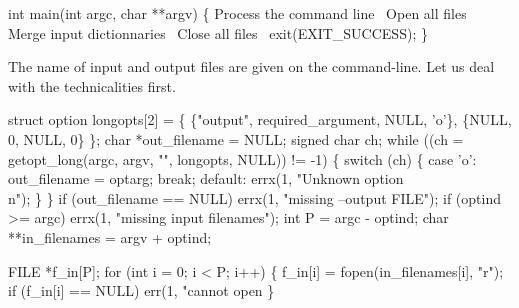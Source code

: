\documentclass{article}%
\begin{document}
\nwendcode{}\endmoddef\nwstartdeflinemarkup{}\nwenddeflinemarkup
int main(int argc, char **argv)
\{
        \LA{}Process the command line~{\nwtagstyle{}}\RA{}
        \LA{}Open all files~{\nwtagstyle{}}\RA{}
        \LA{}Merge input dictionnaries~{\nwtagstyle{}}\RA{}
        \LA{}Close all files~{\nwtagstyle{}}\RA{}
        exit(EXIT_SUCCESS);
\}

\nwendcode{}The name of input and output files are given on the command-line. Let us deal with the technicalities first.

\nwenddocs{}\endmoddef\nwstartdeflinemarkup{}\nwenddeflinemarkup
struct option longopts[2] = \{
        \{"output", required_argument, NULL, 'o'\},
        \{NULL, 0, NULL, 0\}
\};
char *out_filename = NULL;
signed char ch;
while ((ch = getopt_long(argc, argv, "", longopts, NULL)) != -1) \{
        switch (ch) \{
        case 'o':
                out_filename = optarg;
                break;
        default:
                errx(1, "Unknown option\\n");
        \}
\}
if (out_filename == NULL)
        errx(1, "missing --output FILE");
if (optind >= argc)
        errx(1, "missing input filenames");
int P = argc - optind;
char **in_filenames = argv + optind;

\nwendcode{}\endmoddef\nwstartdeflinemarkup{}\nwenddeflinemarkup
FILE *f_in[P];
for (int i = 0; i < P; i++) \{
        f_in[i] = fopen(in_filenames[i], "r");
        if (f_in[i] == NULL)
                err(1, "cannot open %
\}
\end{document}
